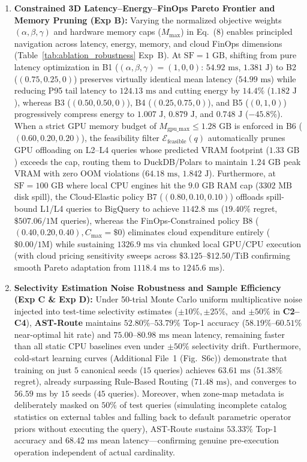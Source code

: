 \documentclass[10pt,a4paper]{article}
\begin{document}
\begin{enumerate}[leftmargin=1.5em,itemsep=0.8pt]
    \item \textbf{Constrained 3D Latency--Energy--FinOps Pareto Frontier and Memory Pruning (Exp B):} Varying the normalized objective weights $(\alpha, \beta, \gamma)$ and hardware memory caps ($M_{\max}$) in Eq.~(8) enables principled navigation across latency, energy, memory, and cloud FinOps dimensions (Table~\ref{tab:ablation_robustness} Exp~B). At $\text{SF}=1\text{ GB}$, shifting from pure latency optimization in B1 ($(\alpha,\beta,\gamma)=(1,0,0)$: $54.92\text{ ms}$, $1.381\text{ J}$) to B2 ($(0.75, 0.25, 0)$) preserves virtually identical mean latency ($54.99\text{ ms}$) while reducing P95 tail latency to $124.13\text{ ms}$ and cutting energy by $14.4\%$ ($1.182\text{ J}$), whereas B3 ($(0.50, 0.50, 0)$), B4 ($(0.25, 0.75, 0)$), and B5 ($(0, 1, 0)$) progressively compress energy to $1.007\text{ J}$, $0.879\text{ J}$, and $0.748\text{ J}$ ($-45.8\%$). When a strict GPU memory budget of $M_{\text{gpu\_max}} \le 1.28\text{ GB}$ is enforced in B6 ($(0.60, 0.20, 0.20)$), the feasibility filter $\mathcal{E}_{\text{feasible}}(q)$ automatically prunes GPU offloading on L2--L4 queries whose predicted VRAM footprint ($1.33\text{ GB}$) exceeds the cap, routing them to DuckDB/Polars to maintain $1.24\text{ GB}$ peak VRAM with zero OOM violations ($64.18\text{ ms}$, $1.842\text{ J}$). Furthermore, at $\text{SF}=100\text{ GB}$ where local CPU engines hit the $9.0\text{ GB}$ RAM cap ($3302\text{ MB}$ disk spill), the Cloud-Elastic policy B7 ($(0.80, 0.10, 0.10)$) offloads spill-bound L1/L4 queries to BigQuery to achieve $1142.8\text{ ms}$ ($19.40\%$ regret, $\$507.06/1\text{M}$ queries), whereas the FinOps-Constrained policy B8 ($(0.40, 0.20, 0.40), C_{\max}=\$0$) eliminates cloud expenditure entirely ($\$0.00/1\text{M}$) while sustaining $1326.9\text{ ms}$ via chunked local GPU/CPU execution (with cloud pricing sensitivity sweeps across $\$3.125\text{--}\$12.50\text{/TiB}$ confirming smooth Pareto adaptation from $1118.4\text{ ms}$ to $1245.6\text{ ms}$). 
    \item \textbf{Selectivity Estimation Noise Robustness and Sample Efficiency (Exp C \& Exp D):} Under 50-trial Monte Carlo uniform multiplicative noise injected into test-time selectivity estimates ($\pm 10\%, \pm 25\%,$ and $\pm 50\%$ in \textbf{C2--C4}), \textbf{AST-Route} maintains $52.80\%\text{--}53.79\%$ Top-1 accuracy ($58.19\%\text{--}60.51\%$ near-optimal hit rate) and $75.00\text{--}80.98\text{ ms}$ mean latency, remaining faster than all static CPU baselines even under $\pm 50\%$ selectivity drift. Furthermore, cold-start learning curves (Additional File~1 (Fig.~S6c)) demonstrate that training on just $5$ canonical seeds ($15$ queries) achieves $63.61\text{ ms}$ ($51.38\%$ regret), already surpassing Rule-Based Routing ($71.48\text{ ms}$), and converges to $56.59\text{ ms}$ by $15$ seeds ($45$ queries). Moreover, when zone-map metadata is deliberately masked on $50\%$ of test queries (simulating incomplete catalog statistics on external tables and falling back to default parametric operator priors without executing the query), AST-Route sustains $53.33\%$ Top-1 accuracy and $68.42\text{ ms}$ mean latency---confirming genuine pre-execution operation independent of actual cardinality.

\end{enumerate}
\end{document}
